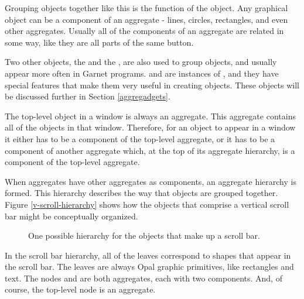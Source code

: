 Grouping objects together like this is the function of the 
object.  Any graphical object can be a component of an aggregate - lines,
circles, rectangles, and even other aggregates.  Usually all of the
components of an aggregate are related in some way, like they are all
parts of the same button.

Two other objects, the  and the
, are also used to group objects, and usually appear more
often in Garnet programs.   and  are
instances of , and they have special features that make
them very useful in creating objects.  These objects will be discussed
further in Section \ref{aggregadgets}.

The top-level object in a window is always an aggregate.  This
aggregate contains all of the objects in that window.
Therefore, for an object to appear in a window it either has to be a
component of the top-level aggregate, or it has to be a component of
another aggregate which, at the top of its aggregate hierarchy, is a
component of the top-level aggregate.

When aggregates have other aggregates as components, an aggregate hierarchy
is formed.  This hierarchy describes the way that objects are grouped together.
Figure \ref{v-scroll-hierarchy} shows how the objects that comprise a
vertical scroll bar might be conceptually organized.

\begin{figure}
\begin{center}
\begin{makeimage}
\end{makeimage}
\begin{latexonly}
\end{latexonly}
                 \end{center}
\caption{One possible hierarchy for the objects that make up a scroll bar.}
\end{figure}

In the scroll bar hierarchy, all of the leaves correspond to shapes
that appear in the scroll bar.  The leaves are always Opal graphic
primitives, like rectangles and text.  The nodes  and
 are both aggregates, each with two components.
And, of course, the top-level  node is an aggregate.

